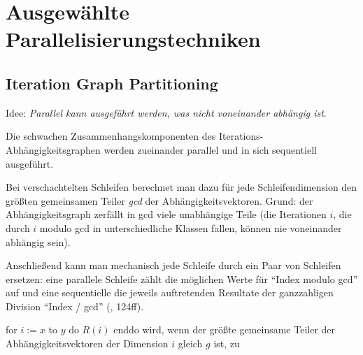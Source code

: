 \setcounter{section}{9}
\section{Ausgewählte Parallelisierungstechniken}


\subsection{Iteration Graph Partitioning}
\label{sec:igp}

Idee: \textit{Parallel kann ausgeführt werden, was nicht voneinander
abhängig ist}.

Die schwachen Zusammenhangskomponenten des
Iterations-Abhängigkeitsgraphen werden zueinander parallel und in sich
sequentiell ausgeführt.

Bei verschachtelten Schleifen berechnet man dazu für jede
Schleifendimension den größten gemeinsamen Teiler {\it gcd\/} der
Abhängigkeitsvektoren. Grund: der Abhängigkeitsgraph zerfällt in gcd
viele unabhängige Teile (die Iterationen $i$, die durch $i$ modulo gcd
in unterschiedliche Klassen fallen, können nie voneinander abhängig
sein).

Anschließend kann man mechanisch jede Schleife durch ein Paar von
Schleifen ersetzen: eine parallele Schleife zählt die möglichen Werte
für ``Index modulo gcd'' auf und eine sequentielle die jeweils
auftretenden Resultate der ganzzahligen Division ``Index / gcd'' (\cite{Ban94},
124ff).

{\sf for $i:=x$ to $y$ do $R(i)$ enddo} wird, wenn der größte
gemeinsame Teiler der Abhängigkeitsvektoren der Dimension $i$ gleich
$g$ ist, zu


\begin{algorithm}[H]
\end{algorithm}


